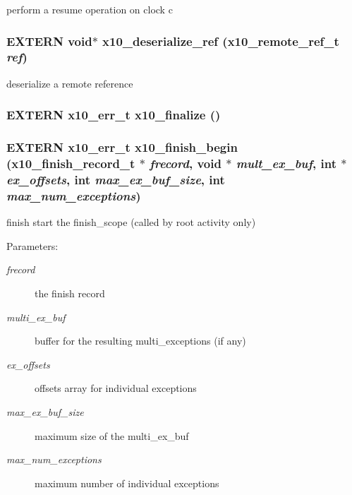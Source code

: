 perform a resume operation on clock c 

\subsubsection{\setlength{\rightskip}{0pt plus 5cm}EXTERN void$\ast$ x10\_\-deserialize\_\-ref ({\bf x10\_\-remote\_\-ref\_\-t} {\em ref})}\label{x10_8h_a19}


deserialize a remote reference 

\subsubsection{\setlength{\rightskip}{0pt plus 5cm}EXTERN {\bf x10\_\-err\_\-t} x10\_\-finalize ()}\label{x10_8h_a3}


\subsubsection{\setlength{\rightskip}{0pt plus 5cm}EXTERN {\bf x10\_\-err\_\-t} x10\_\-finish\_\-begin ({\bf x10\_\-finish\_\-record\_\-t} $\ast$ {\em frecord}, void $\ast$ {\em mult\_\-ex\_\-buf}, int $\ast$ {\em ex\_\-offsets}, int {\em max\_\-ex\_\-buf\_\-size}, int {\em max\_\-num\_\-exceptions})}\label{x10_8h_a8}


finish start the finish\_\-scope (called by root activity only) 

\begin{Desc}
\item[Parameters:]
\begin{description}
\item[{\em frecord}]the finish record \item[{\em multi\_\-ex\_\-buf}]buffer for the resulting multi\_\-exceptions (if any) \item[{\em ex\_\-offsets}]offsets array for individual exceptions \item[{\em max\_\-ex\_\-buf\_\-size}]maximum size of the multi\_\-ex\_\-buf \item[{\em max\_\-num\_\-exceptions}]maximum number of individual exceptions \end{description}
\end{Desc}
